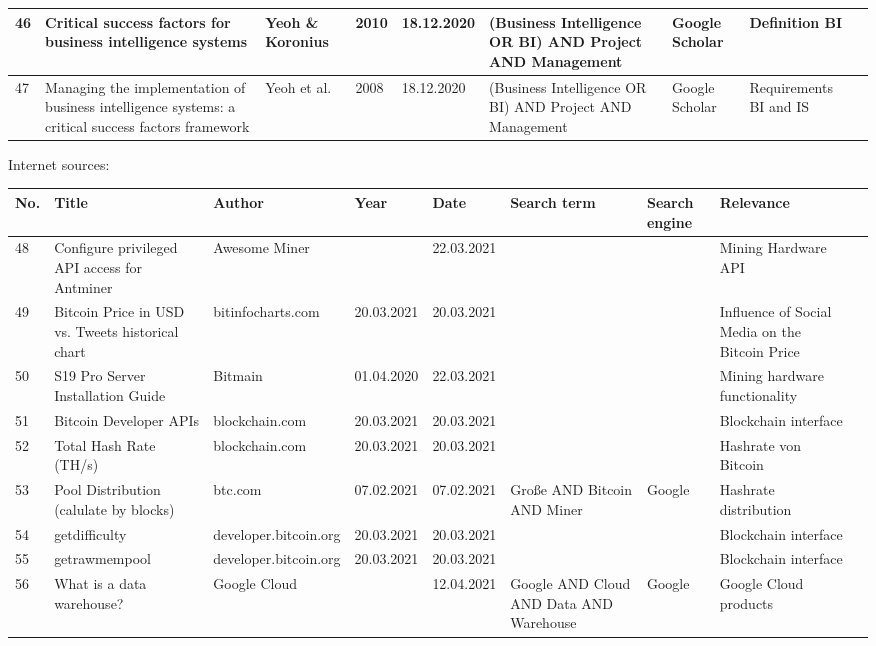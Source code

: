 \begin{table}[H]
\begin{tabularx}{\textwidth}[ht]{|l|X|X|l|l|X|l|X|X|}
		\hline
		46 & Critical success factors for business intelligence systems & Yeoh \& Koronius & 2010 & 18.12.2020 & (Business Intelligence OR BI) AND Project AND Management & Google Scholar & Definition BI \\
		\hline
		47 & Managing the implementation of business intelligence systems: a critical success factors framework & Yeoh et al. & 2008 & 18.12.2020 & (Business Intelligence OR BI) AND Project AND Management & Google Scholar & Requirements BI and IS \\
		\hline
	\end{tabularx}
\end{table}

\newpage
Internet sources:

\begin{table}[H]
	\scriptsize
  	\begin{tabularx}{\textwidth}[ht]{|l|X|X|l|l|X|l|X|X|}
		\hline
		\textbf{No.} & \textbf{Title} & \textbf{Author} & \textbf{Year} & \textbf{Date} & \textbf{Search term} & \textbf{Search engine} & \textbf{Relevance} \\
		\hline\hline
		48 & Configure privileged API access for Antminer & Awesome Miner & & 22.03.2021 & & & Mining Hardware API \\
		\hline
		49 & Bitcoin Price in USD vs. Tweets historical chart & bitinfocharts.com & 20.03.2021 & 20.03.2021 & & & Influence of Social Media on the Bitcoin Price \\
		\hline
		50 & S19 Pro Server Installation Guide & Bitmain & 01.04.2020 & 22.03.2021 & & & Mining hardware functionality \\
		\hline
		51 & Bitcoin Developer APIs & blockchain.com & 20.03.2021 & 20.03.2021 & & & Blockchain interface \\
		\hline
		52 & Total Hash Rate (TH/s) & blockchain.com & 20.03.2021 & 20.03.2021 & & & Hashrate von Bitcoin \\
		\hline
		53 & Pool Distribution (calulate by blocks) & btc.com & 07.02.2021 & 07.02.2021 & Große AND Bitcoin AND Miner & Google & Hashrate distribution \\
		\hline
		54 & getdifficulty & developer.bitcoin.org & 20.03.2021 & 20.03.2021 & & & Blockchain interface \\
		\hline
		55 & getrawmempool & developer.bitcoin.org & 20.03.2021 & 20.03.2021 & & & Blockchain interface \\
		\hline
		56 & What is a data warehouse? & Google Cloud & & 12.04.2021 & Google AND Cloud AND Data AND Warehouse & Google & Google Cloud products \\

\end{tabularx}
\end{table}

